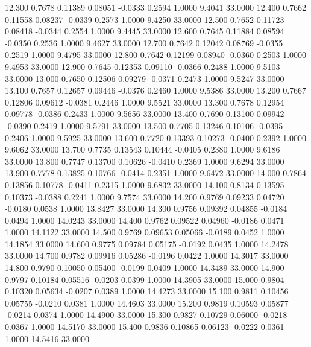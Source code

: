   12.300   0.7678   0.11389   0.08051  -0.0333   0.2594   1.0000   9.4041  33.0000
  12.400   0.7662   0.11558   0.08237  -0.0339   0.2573   1.0000   9.4250  33.0000
  12.500   0.7652   0.11723   0.08418  -0.0344   0.2554   1.0000   9.4445  33.0000
  12.600   0.7645   0.11884   0.08594  -0.0350   0.2536   1.0000   9.4627  33.0000
  12.700   0.7642   0.12042   0.08769  -0.0355   0.2519   1.0000   9.4795  33.0000
  12.800   0.7642   0.12199   0.08940  -0.0360   0.2503   1.0000   9.4953  33.0000
  12.900   0.7645   0.12353   0.09110  -0.0366   0.2488   1.0000   9.5103  33.0000
  13.000   0.7650   0.12506   0.09279  -0.0371   0.2473   1.0000   9.5247  33.0000
  13.100   0.7657   0.12657   0.09446  -0.0376   0.2460   1.0000   9.5386  33.0000
  13.200   0.7667   0.12806   0.09612  -0.0381   0.2446   1.0000   9.5521  33.0000
  13.300   0.7678   0.12954   0.09778  -0.0386   0.2433   1.0000   9.5656  33.0000
  13.400   0.7690   0.13100   0.09942  -0.0390   0.2419   1.0000   9.5791  33.0000
  13.500   0.7705   0.13246   0.10106  -0.0395   0.2406   1.0000   9.5925  33.0000
  13.600   0.7720   0.13393   0.10273  -0.0400   0.2392   1.0000   9.6062  33.0000
  13.700   0.7735   0.13543   0.10444  -0.0405   0.2380   1.0000   9.6186  33.0000
  13.800   0.7747   0.13700   0.10626  -0.0410   0.2369   1.0000   9.6294  33.0000
  13.900   0.7778   0.13825   0.10766  -0.0414   0.2351   1.0000   9.6472  33.0000
  14.000   0.7864   0.13856   0.10778  -0.0411   0.2315   1.0000   9.6832  33.0000
  14.100   0.8134   0.13595   0.10373  -0.0388   0.2241   1.0000   9.7574  33.0000
  14.200   0.9769   0.09233   0.04720  -0.0180   0.0538   1.0000  13.8427  33.0000
  14.300   0.9756   0.09392   0.04855  -0.0184   0.0494   1.0000  14.0243  33.0000
  14.400   0.9762   0.09522   0.04960  -0.0186   0.0471   1.0000  14.1122  33.0000
  14.500   0.9769   0.09653   0.05066  -0.0189   0.0452   1.0000  14.1854  33.0000
  14.600   0.9775   0.09784   0.05175  -0.0192   0.0435   1.0000  14.2478  33.0000
  14.700   0.9782   0.09916   0.05286  -0.0196   0.0422   1.0000  14.3017  33.0000
  14.800   0.9790   0.10050   0.05400  -0.0199   0.0409   1.0000  14.3489  33.0000
  14.900   0.9797   0.10184   0.05516  -0.0203   0.0399   1.0000  14.3905  33.0000
  15.000   0.9804   0.10320   0.05634  -0.0207   0.0389   1.0000  14.4273  33.0000
  15.100   0.9811   0.10456   0.05755  -0.0210   0.0381   1.0000  14.4603  33.0000
  15.200   0.9819   0.10593   0.05877  -0.0214   0.0374   1.0000  14.4900  33.0000
  15.300   0.9827   0.10729   0.06000  -0.0218   0.0367   1.0000  14.5170  33.0000
  15.400   0.9836   0.10865   0.06123  -0.0222   0.0361   1.0000  14.5416  33.0000
